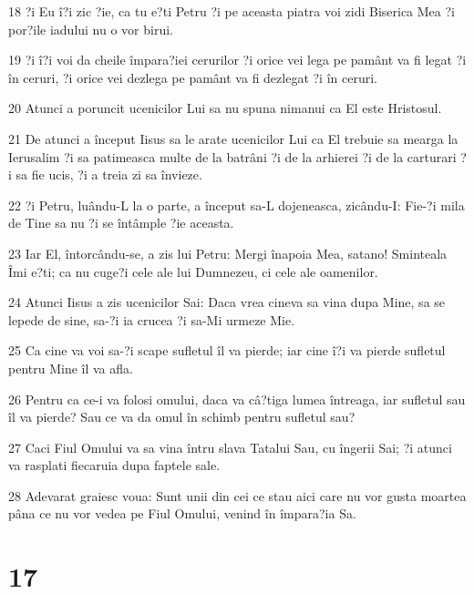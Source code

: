 \par 18 ?i Eu î?i zic ?ie, ca tu e?ti Petru ?i pe aceasta piatra voi zidi Biserica Mea ?i por?ile iadului nu o vor birui.
\par 19 ?i î?i voi da cheile împara?iei cerurilor ?i orice vei lega pe pamânt va fi legat ?i în ceruri, ?i orice vei dezlega pe pamânt va fi dezlegat ?i în ceruri.
\par 20 Atunci a poruncit ucenicilor Lui sa nu spuna nimanui ca El este Hristosul.
\par 21 De atunci a început Iisus sa le arate ucenicilor Lui ca El trebuie sa mearga la Ierusalim ?i sa patimeasca multe de la batrâni ?i de la arhierei ?i de la carturari ?i sa fie ucis, ?i a treia zi sa învieze.
\par 22 ?i Petru, luându-L la o parte, a început sa-L dojeneasca, zicându-I: Fie-?i mila de Tine sa nu ?i se întâmple ?ie aceasta.
\par 23 Iar El, întorcându-se, a zis lui Petru: Mergi înapoia Mea, satano! Sminteala Îmi e?ti; ca nu cuge?i cele ale lui Dumnezeu, ci cele ale oamenilor.
\par 24 Atunci Iisus a zis ucenicilor Sai: Daca vrea cineva sa vina dupa Mine, sa se lepede de sine, sa-?i ia crucea ?i sa-Mi urmeze Mie.
\par 25 Ca cine va voi sa-?i scape sufletul îl va pierde; iar cine î?i va pierde sufletul pentru Mine îl va afla.
\par 26 Pentru ca ce-i va folosi omului, daca va câ?tiga lumea întreaga, iar sufletul sau îl va pierde? Sau ce va da omul în schimb pentru sufletul sau?
\par 27 Caci Fiul Omului va sa vina întru slava Tatalui Sau, cu îngerii Sai; ?i atunci va rasplati fiecaruia dupa faptele sale.
\par 28 Adevarat graiesc voua: Sunt unii din cei ce stau aici care nu vor gusta moartea pâna ce nu vor vedea pe Fiul Omului, venind în împara?ia Sa.

\chapter{17}

